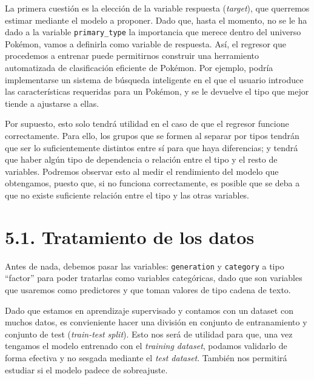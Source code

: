 \documentclass[
  12pt,
]{extreport}
\newenvironment{Shaded}{\begin{snugshade}}{\end{snugshade}}
\newcommand{\DecValTok}[1]{\textcolor[rgb]{0.68,0.00,0.00}{#1}}
\newcommand{\FunctionTok}[1]{\textcolor[rgb]{0.28,0.35,0.67}{#1}}
\newcommand{\NormalTok}[1]{\textcolor[rgb]{0.00,0.23,0.31}{#1}}
\newcommand{\OtherTok}[1]{\textcolor[rgb]{0.00,0.23,0.31}{#1}}
\newcommand{\SpecialCharTok}[1]{\textcolor[rgb]{0.37,0.37,0.37}{#1}}
\begin{document}
La primera cuestión es la elección de la variable respuesta
(\emph{target}), que querremos estimar mediante el modelo a proponer.
Dado que, hasta el momento, no se le ha dado a la variable
\texttt{primary\_type} la importancia que merece dentro del universo
Pokémon, vamos a definirla como variable de respuesta. Así, el regresor
que procedemos a entrenar puede permitirnos construir una herramiento
automatizada de clasificación eficiente de Pokémon. Por ejemplo, podría
implementarse un sistema de búsqueda inteligente en el que el usuario
introduce las características requeridas para un Pokémon, y se le
devuelve el tipo que mejor tiende a ajustarse a ellas.

Por supuesto, esto solo tendrá utilidad en el caso de que el regresor
funcione correctamente. Para ello, los grupos que se formen al separar
por tipos tendrán que ser lo suficientemente distintos entre sí para que
haya diferencias; y tendrá que haber algún tipo de dependencia o
relación entre el tipo y el resto de variables. Podremos observar esto
al medir el rendimiento del modelo que obtengamos, puesto que, si no
funciona correctamente, es posible que se deba a que no existe
suficiente relación entre el tipo y las otras variables.

\section{5.1. Tratamiento de los datos}\label{tratamiento-de-los-datos}

Antes de nada, debemos pasar las variables: \texttt{generation} y
\texttt{category} a tipo ``factor'' para poder tratarlas como variables
categóricas, dado que son variables que usaremos como predictores y que
toman valores de tipo cadena de texto.

\begin{Shaded}
\end{Shaded}

Dado que estamos en aprendizaje supervisado y contamos con un dataset
con muchos datos, es convieniente hacer una división en conjunto de
entranamiento y conjunto de test (\emph{train-test split}). Esto nos
será de utilidad para que, una vez tengamos el modelo entrenado con el
\emph{training dataset}, podamos validarlo de forma efectiva y no
sesgada mediante el \emph{test dataset}. También nos permitirá estudiar
si el modelo padece de sobreajuste.
\end{document}
